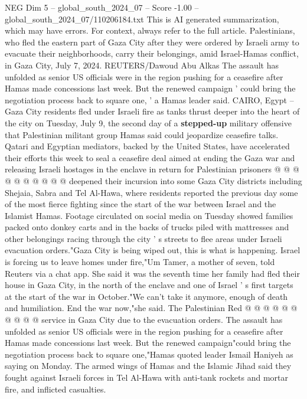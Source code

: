 \begin{textsample}{NEG Dim 5 – global\_south\_2024\_07 – Score -1.00 – global\_south\_2024\_07/110206184.txt}  \label{ex:f5_neg_274}
This is AI generated summarization, which may have errors.
For context, always refer to the full article.
Palestinians, who fled the eastern part of Gaza City after they were ordered by Israeli army to evacuate their neighborhoods, carry their belongings, amid Israel-Hamas conflict, in Gaza City, July 7, 2024.
REUTERS/Dawoud Abu Alkas The assault has unfolded as senior US officials were in the region pushing for a ceasefire after Hamas made concessions last week.
But the renewed campaign ' could bring the negotiation process back to square one, ' a Hamas leader said.
CAIRO, Egypt -- Gaza City residents fled under Israeli fire as tanks thrust deeper into the heart of the city on Tuesday, July 9, the second day of a \textbf{stepped-up} military offensive that Palestinian militant group Hamas said could jeopardize ceasefire talks.
Qatari and Egyptian mediators, backed by the United States, have accelerated their efforts this week to seal a ceasefire deal aimed at ending the Gaza war and releasing Israeli hostages in the enclave in return for Palestinian prisoners @ @ @ @ @ @ @ @ @ @ deepened their incursion into some Gaza City districts including Shejaia, Sabra and Tel Al-Hawa, where residents reported the previous day some of the most fierce fighting since the start of the war between Israel and the Islamist Hamas.
Footage circulated on social media on Tuesday showed families packed onto donkey carts and in the backs of trucks piled with mattresses and other belongings racing through the city ' s streets to flee areas under Israeli evacuation orders."Gaza City is being wiped out, this is what is happening.
Israel is forcing us to leave homes under fire,"Um Tamer, a mother of seven, told Reuters via a chat app.
She said it was the seventh time her family had fled their house in Gaza City, in the north of the enclave and one of Israel ' s first targets at the start of the war in October."We can't take it anymore, enough of death and humiliation.
End the war now,"she said.
The Palestinian Red @ @ @ @ @ @ @ @ @ @ service in Gaza City due to the evacuation orders.
The assault has unfolded as senior US officials were in the region pushing for a ceasefire after Hamas made concessions last week.
But the renewed campaign"could bring the negotiation process back to square one,"Hamas quoted leader Ismail Haniyeh as saying on Monday.
The armed wings of Hamas and the Islamic Jihad said they fought against Israeli forces in Tel Al-Hawa with anti-tank rockets and mortar fire, and inflicted casualties.

\end{textsample}
